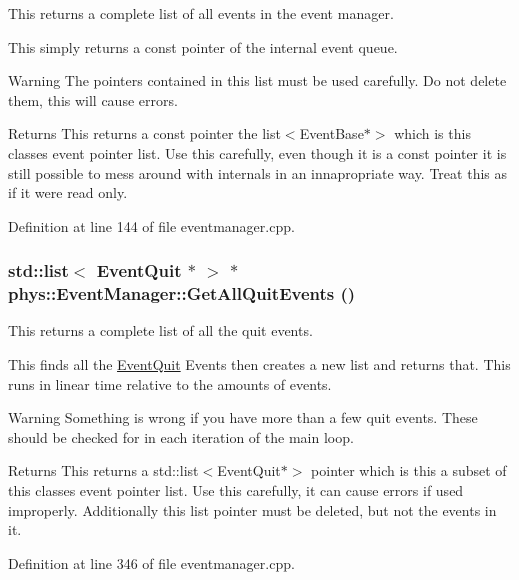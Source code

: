 This returns a complete list of all events in the event manager. 

This simply returns a const pointer of the internal event queue. \begin{DoxyWarning}{Warning}
The pointers contained in this list must be used carefully. Do not delete them, this will cause errors. 
\end{DoxyWarning}
\begin{DoxyReturn}{Returns}
This returns a const pointer the list$<$EventBase$\ast$$>$ which is this classes event pointer list. Use this carefully, even though it is a const pointer it is still possible to mess around with internals in an innapropriate way. Treat this as if it were read only. 
\end{DoxyReturn}


Definition at line 144 of file eventmanager.cpp.

\hypertarget{classphys_1_1EventManager_afefd52a9693bc5541592997abbf3c53f}{
\subsubsection[{GetAllQuitEvents}]{\setlength{\rightskip}{0pt plus 5cm}std::list$<$ {\bf EventQuit} $\ast$ $>$ $\ast$ phys::EventManager::GetAllQuitEvents ()}}
\label{da/dde/classphys_1_1EventManager_afefd52a9693bc5541592997abbf3c53f}


This returns a complete list of all the quit events. 

This finds all the \hyperlink{classphys_1_1EventQuit}{EventQuit} Events then creates a new list and returns that. This runs in linear time relative to the amounts of events. \begin{DoxyWarning}{Warning}
Something is wrong if you have more than a few quit events. These should be checked for in each iteration of the main loop. 
\end{DoxyWarning}
\begin{DoxyReturn}{Returns}
This returns a std::list$<$EventQuit$\ast$$>$ pointer which is this a subset of this classes event pointer list. Use this carefully, it can cause errors if used improperly. Additionally this list pointer must be deleted, but not the events in it. 
\end{DoxyReturn}


Definition at line 346 of file eventmanager.cpp.

